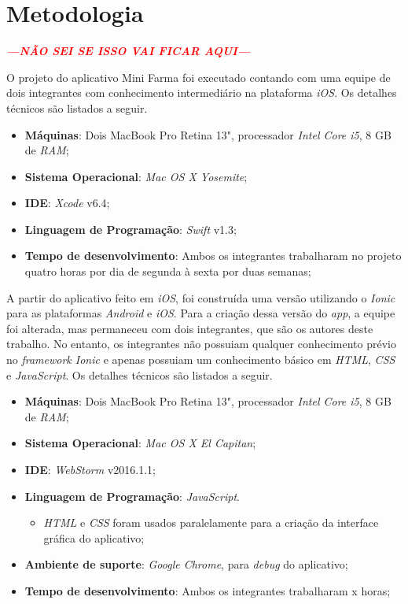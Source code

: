 \chapter{Metodologia} \label{metodologia}

\textcolor{red}{\textbf{\textit{---NÃO SEI SE ISSO VAI FICAR AQUI---}}}

O projeto do aplicativo Mini Farma foi executado contando com uma equipe de dois integrantes com 
conhecimento intermediário na plataforma \textit{iOS}. Os detalhes técnicos são listados a seguir.
\begin{itemize}
    \item \textbf{Máquinas}: Dois MacBook Pro Retina 13", processador \textit{Intel Core i5}, 8 GB de \textit{RAM};
    \item \textbf{Sistema Operacional}: \textit{Mac OS X Yosemite};
    \item \textbf{IDE}: \textit{Xcode} v6.4;
    \item \textbf{Linguagem de Programação}: \textit{Swift} v1.3;
    \item \textbf{Tempo de desenvolvimento}: Ambos os integrantes trabalharam no projeto quatro horas por dia de segunda à sexta por duas semanas;
\end{itemize}

A partir do aplicativo feito em \textit{iOS}, foi construída uma versão utilizando o \textit{Ionic} para as plataformas \textit{Android} e \textit{iOS}.
Para a criação dessa versão do \textit{app}, a equipe foi alterada, mas permaneceu com dois integrantes, que são os autores deste trabalho.
No entanto, os integrantes não possuiam qualquer conhecimento prévio no \textit{framework Ionic}
e apenas possuiam um conhecimento básico em \textit{HTML}, \textit{CSS} e \textit{JavaScript}. Os detalhes técnicos são listados a seguir.
   
\begin{itemize}
    \item \textbf{Máquinas}: Dois MacBook Pro Retina 13", processador \textit{Intel Core i5}, 8 GB de \textit{RAM};
    \item \textbf{Sistema Operacional}: \textit{Mac OS X El Capitan};
    \item \textbf{IDE}: \textit{WebStorm} v2016.1.1;
    \item \textbf{Linguagem de Programação}: \textit{JavaScript}. 
    \begin{itemize}
        \item \textit{HTML} e \textit{CSS} foram usados paralelamente para a criação da interface gráfica do aplicativo;
    \end{itemize}
    \item \textbf{Ambiente de suporte}: \textit{Google Chrome}, para \textit{debug} do aplicativo;
    \item \textbf{Tempo de desenvolvimento}: Ambos os integrantes trabalharam x horas;
\end{itemize}


